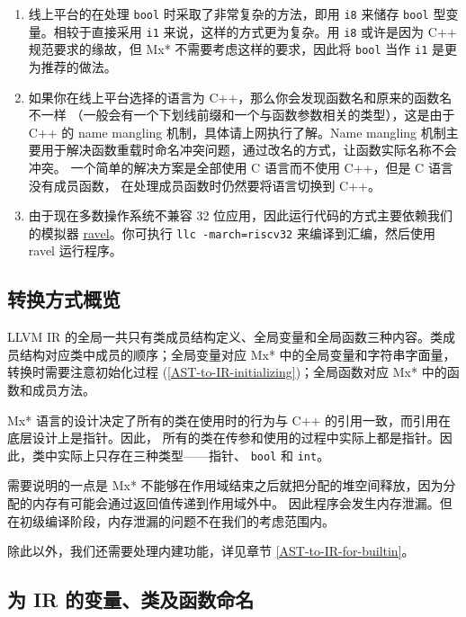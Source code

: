 \begin{remark}
\begin{enumerate}
  \item 线上平台的在处理 \texttt{bool} 时采取了非常复杂的方法，即用 \texttt{i8} 来储存
    \texttt{bool} 型变量。相较于直接采用 \texttt{i1} 来说，这样的方式更为复杂。用 \texttt{i8}
    或许是因为 C++ 规范要求的缘故，但 Mx* 不需要考虑这样的要求，因此将 \texttt{bool} 当作
    \texttt{i1} 是更为推荐的做法。
  \item 如果你在线上平台选择的语言为 C++，那么你会发现函数名和原来的函数名不一样
    （一般会有一个下划线前缀和一个与函数参数相关的类型），这是由于
    C++ 的 name mangling 机制，具体请上网执行了解。Name mangling
    机制主要用于解决函数重载时命名冲突问题，通过改名的方式，让函数实际名称不会冲突。
    一个简单的解决方案是全部使用 C 语言而不使用 C++，但是 C 语言没有成员函数，
    在处理成员函数时仍然要将语言切换到 C++。
  \item 由于现在多数操作系统不兼容 32 位应用，因此运行代码的方式主要依赖我们的模拟器
    \href{https://github.com/Engineev/ravel}{ravel}。你可执行
    \texttt{llc -march=riscv32} 来编译到汇编，然后使用 ravel 运行程序。
\end{enumerate}
\end{remark}

\subsection{转换方式概览}\label{AST-to-IR-details}

LLVM IR 的全局一共只有类成员结构定义、全局变量和全局函数三种内容。类成员结构对应类中成员的顺序；全局变量对应 Mx*
中的全局变量和字符串字面量，转换时需要注意初始化过程
(\ref{AST-to-IR-initializing})；全局函数对应 Mx* 中的函数和成员方法。

Mx* 语言的设计决定了所有的类在使用时的行为与 C++ 的引用一致，而引用在底层设计上是指针。因此，
所有的类在传参和使用的过程中实际上都是指针。因此，类中实际上只存在三种类型——指针、
\texttt{bool} 和 \texttt{int}。

需要说明的一点是 Mx* 不能够在作用域结束之后就把分配的堆空间释放，因为分配的内存有可能会通过返回值传递到作用域外中。
因此程序会发生内存泄漏。但在初级编译阶段，内存泄漏的问题不在我们的考虑范围内。

除此以外，我们还需要处理内建功能，详见章节
\ref{AST-to-IR-for-builtin}。

\subsection{为 IR 的变量、类及函数命名}\label{AST-to-IR-naming}


